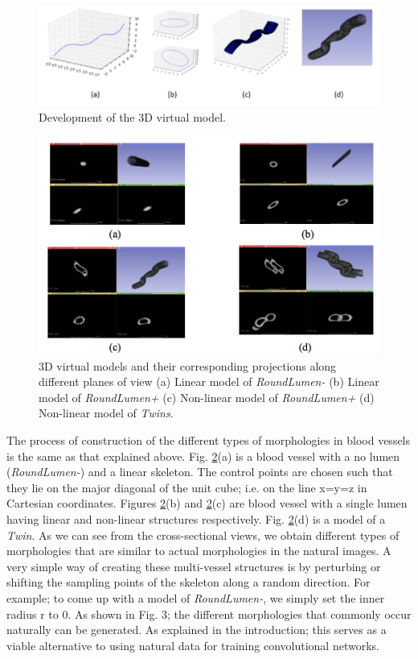\begin{figure}[ht!]
\centering
\includegraphics[width=1.0\textwidth]{img/3D_model}
\caption{Development of the 3D virtual model.}
\label{fig:3D_model}
\end{figure}

\begin{figure}[ht!]
\centering
\includegraphics[width=1.0\textwidth]{img/slicer}
\caption{3D virtual models and their corresponding projections along different planes of view (a) Linear model of \textit{RoundLumen-} (b) Linear model of \textit{RoundLumen+} (c) Non-linear model of \textit{RoundLumen+} (d) Non-linear model of \textit{Twins}.}
\label{fig:slicer}
\end{figure}

The process of construction of the different types of morphologies in blood vessels is the same as that explained above. Fig.  \ref{fig:slicer}(a) is a blood vessel with a no lumen (\textit{RoundLumen-}) and a linear skeleton. The control points are chosen such that they lie on the major diagonal of the unit cube; i.e. on the line x=y=z in Cartesian coordinates.  Figures  \ref{fig:slicer}(b) and  \ref{fig:slicer}(c) are blood vessel with a single lumen having linear and non-linear structures respectively. Fig.  \ref{fig:slicer}(d) is a model of a \textit{Twin}. As we can see from the cross-sectional views, we obtain different types of morphologies that are similar to actual morphologies in the natural images. A very simple way of creating these multi-vessel structures is by perturbing or shifting the sampling points of the skeleton along a random direction. For example; to come up with a model of \textit{RoundLumen-}, we simply set the inner radius r to 0. As shown in Fig. 3; the different morphologies that commonly occur naturally can be generated. As explained in the introduction; this serves as a viable alternative to using natural data for training convolutional networks.

